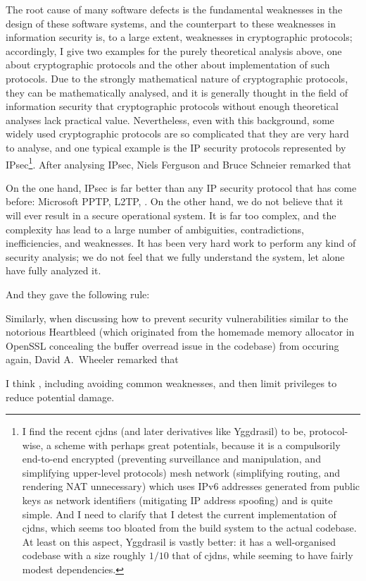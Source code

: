 The root cause of many software defects is the fundamental weaknesses in the
design of these software systems, and the counterpart to these weaknesses in
information security is, to a large extent, weaknesses in cryptographic
protocols; accordingly, I give two examples for the purely theoretical analysis
above, one about cryptographic protocols and the other about implementation of
such protocols.  Due to the strongly mathematical nature of cryptographic
protocols, they can be mathematically analysed, and it is generally thought
in the field of information security that cryptographic protocols without
enough theoretical analyses lack practical value.
Nevertheless, even with this background, some widely used cryptographic
protocols are so complicated that they are very hard to analyse, and one typical
example is the IP security protocols represented by IPsec\footnote{I find the
recent cjdns (and later derivatives like Yggdrasil) to be, protocol-wise, a
scheme with perhaps great potentials, because it is a compulsorily end-to-end
encrypted (preventing surveillance and manipulation, and simplifying upper-level
protocols) mesh network (simplifying routing, and rendering NAT unnecessary)
which uses IPv6 addresses generated from public keys as network identifiers
(mitigating IP address spoofing) and is quite simple.  And I need to clarify
that I detest the current implementation of cjdns, which seems too bloated from
the build system to the actual codebase.  At least on this aspect, Yggdrasil is
vastly better: it has a well-organised codebase with a size roughly $1/10$ that
of cjdns, while seeming to have fairly modest dependencies.}.  After analysing
IPsec, Niels Ferguson and Bruce Schneier remarked that
\begin{quoting}
	On the one hand, IPsec is far better than any IP security protocol that has
	come before: Microsoft PPTP, L2TP, \etc.  On the other hand, we do not
	believe that it will ever result in a secure operational system.  It is far
	too complex, and the complexity has lead to a large number of ambiguities,
	contradictions, inefficiencies, and weaknesses.  It has been very hard work
	to perform any kind of security analysis; we do not feel that we fully
	understand the system, let alone have fully analyzed it.
\end{quoting}
And they gave the following rule:
\begin{quoting}
\end{quoting}
Similarly, when discussing how to prevent security vulnerabilities similar
to the notorious Heartbleed (which originated from the homemade memory
allocator in OpenSSL concealing the buffer overread issue in the codebase)
from occuring again, David A.\ Wheeler remarked that
\begin{quoting}
	I think , including avoiding
	common weaknesses, and then limit privileges to reduce potential damage.
\end{quoting}

